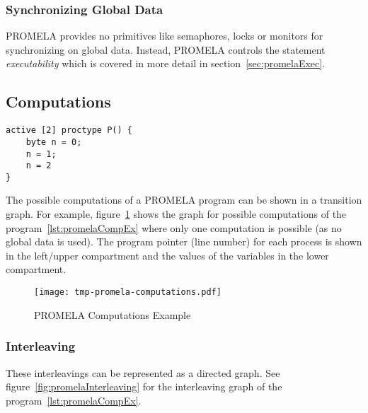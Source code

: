 			\subsubsection{Synchronizing Global Data}
				PROMELA provides no primitives like semaphores, locks or monitors for synchronizing on global data. Instead, PROMELA controls the statement \textit{executability} which is covered in more detail in section~\ref{sec:promelaExec}.

		\subsection{Computations}
			\label{sec:promelaComp}
		
			\begin{lstlisting}[caption = { PROMELA Computations Example }, label = lst:promelaCompEx, language = PROMELA]
active [2] proctype P() {
	byte n = 0;
	n = 1;
	n = 2
}
			\end{lstlisting}
		
			The possible computations of a PROMELA program can be shown in a transition graph. For example, figure~\ref{fig:promelaComp} shows the graph for possible computations of the program~\ref{lst:promelaCompEx} where only one computation is possible (as no global data is used). The program pointer (line number) for each process is shown in the left/upper compartment and the values of the variables in the lower compartment.
			
			\begin{figure}[H]
				\centering
				\texttt{[image: tmp-promela-computations.pdf]}
				\caption{PROMELA Computations Example}
				\label{fig:promelaComp}
			\end{figure}

			\subsubsection{Interleaving}
			
				These interleavings can be represented as a directed graph. See figure~\ref{fig:promelaInterleaving} for the interleaving graph of the program~\ref{lst:promelaCompEx}.
				
